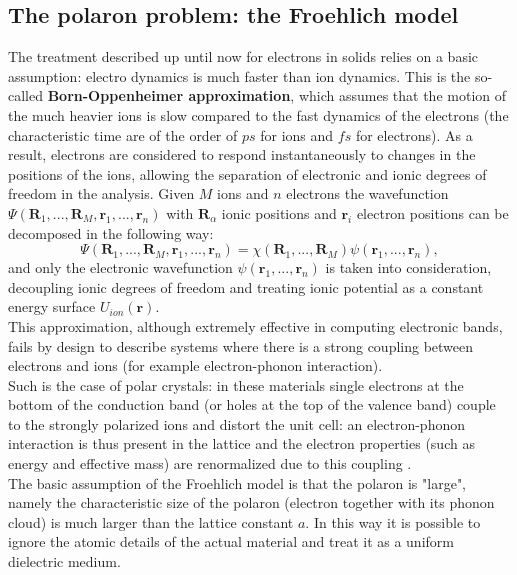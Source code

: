 \subsection{The polaron problem: the Froehlich model}
The treatment described up until now for electrons in solids relies on a basic assumption: electro dynamics is much faster than ion 
dynamics. This is the so-called \textbf{Born-Oppenheimer approximation}, which assumes that the motion of the much heavier ions is 
slow compared to the fast dynamics of the electrons (the characteristic time are of the order of $ps$ for ions and $fs$ for 
electrons). As a result, electrons are considered to respond instantaneously to changes in the positions of the ions, allowing 
the separation of electronic and ionic degrees of freedom in the analysis. Given $M$ ions and $n$ electrons the wavefunction 
$\Psi(\mathbf{R}_1,...,\mathbf{R}_M,\mathbf{r}_1,...,\mathbf{r}_n)$ with $\mathbf{R}_\alpha$ ionic positions and $\mathbf{r}_i$ electron positions can be decomposed in the following way:
\begin{equation}
    \Psi(\mathbf{R}_1,...,\mathbf{R}_M,\mathbf{r}_1,...,\mathbf{r}_n)=\chi(\mathbf{R}_1,...,\mathbf{R}_M)\psi(\mathbf{r}_1,...,\mathbf{r}_n),
\end{equation}
and only the electronic wavefunction $\psi(\mathbf{r}_1,...,\mathbf{r}_n)$ is taken into consideration, decoupling ionic degrees of freedom and treating 
ionic potential as a constant energy surface $U_{ion}(\mathbf{r})$.\\
This approximation, although extremely effective in computing electronic bands, fails by design to describe systems where there is a 
strong coupling between electrons and ions (for example electron-phonon interaction).\\
Such is the case of polar crystals: in these materials single electrons at the bottom of the conduction band (or holes at the top of 
the valence band) couple to the strongly polarized ions and distort the unit cell: an electron-phonon interaction is thus present 
in the lattice and the electron properties (such as energy and effective mass) are renormalized due to this coupling \cite{frohlich1954electrons}.\\
The basic assumption of the Froehlich model is that the polaron is "large", namely the characteristic size of the polaron (electron together 
with its phonon cloud) is much larger than the lattice constant $a$. In this way it is possible to ignore the atomic details of the actual 
material and treat it as a uniform dielectric medium.\\
